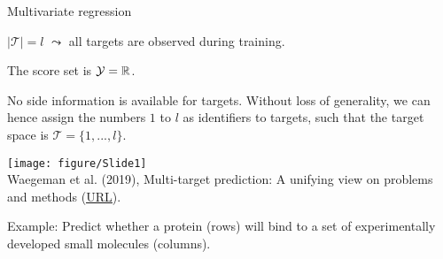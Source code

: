 \documentclass[11pt,compress,t,notes=noshow, xcolor=table]{beamer}
\newcommand{\Tspace}{\mathcal{T}}
\begin{document}
\begin{frame}{Multivariate regression}
	\small
%		
		\begin{enumerate}\small
%			
			\item $|\Tspace|=l$ $\leadsto$ all targets are observed during training. 
	
			\begin{minipage}{0.45\textwidth}    
			
    			\item The score set is $\mathcal{Y} = \mathbb{R}$. 
                \vspace{10pt}
    
                \item No side information is available for targets. Without loss of generality, we can hence assign the numbers $1$ to $l$ as identifiers to targets, such that the target space is $\Tspace = \{1,...,l\}$. 
            \end{minipage}
            \hfill
			\begin{minipage}{0.45\textwidth}    
				\begin{center} 	
				\texttt{[image: figure/Slide1]} 	\tiny
				\\ Waegeman et al. (2019), Multi-target prediction:
				A unifying view on problems and methods (\href{https://arxiv.org/pdf/1809.02352.pdf}{\underline{URL}}).
  	
				\end{center}
			\end{minipage}
		\end{enumerate}
  
    \vspace{10pt}
	Example: Predict whether a protein (rows) will bind to a set of experimentally developed small molecules (columns).
%
\end{frame}
\end{document}
